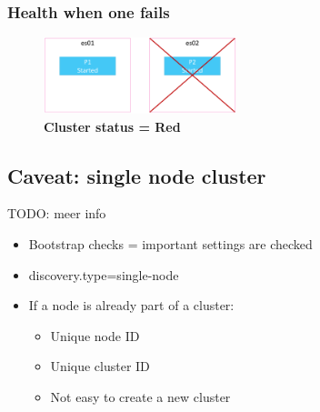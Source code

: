 \documentclass{article}
\begin{document}
\subsubsection{Health when one fails}

\begin{figure}[H]
    \centering
    \includegraphics[width=0.5\textwidth]{change-number-of-replicas-red.png}
    \caption{\textbf{Cluster status = Red}}
\end{figure}

\subsection{Caveat: single node cluster}

TODO: meer info

\begin{itemize}
    \item Bootstrap checks = important settings are checked
    \item discovery.type=single-node
    \item If a node is already part of a cluster:
    \begin{itemize}
        \item Unique node ID
        \item Unique cluster ID
        \item Not easy to create a new cluster
    \end{itemize}
\end{itemize}
\end{document}
